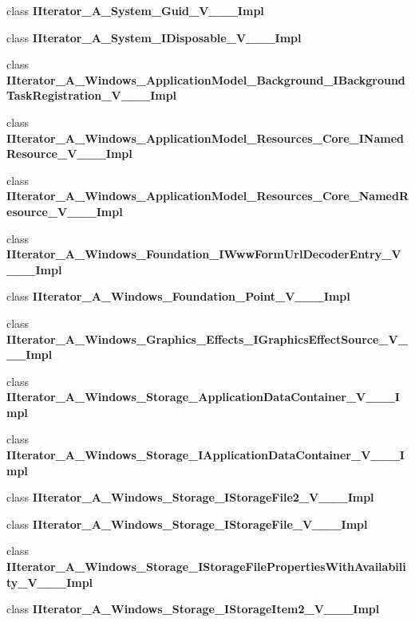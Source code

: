 \begin{DoxyCompactItemize}
\item 
class {\bfseries I\+Iterator\+\_\+\+A\+\_\+\+System\+\_\+\+Guid\+\_\+\+V\+\_\+\+\_\+\+\_\+\+Impl}
\item 
class {\bfseries I\+Iterator\+\_\+\+A\+\_\+\+System\+\_\+\+I\+Disposable\+\_\+\+V\+\_\+\+\_\+\+\_\+\+Impl}
\item 
class {\bfseries I\+Iterator\+\_\+\+A\+\_\+\+Windows\+\_\+\+Application\+Model\+\_\+\+Background\+\_\+\+I\+Background\+Task\+Registration\+\_\+\+V\+\_\+\+\_\+\+\_\+\+Impl}
\item 
class {\bfseries I\+Iterator\+\_\+\+A\+\_\+\+Windows\+\_\+\+Application\+Model\+\_\+\+Resources\+\_\+\+Core\+\_\+\+I\+Named\+Resource\+\_\+\+V\+\_\+\+\_\+\+\_\+\+Impl}
\item 
class {\bfseries I\+Iterator\+\_\+\+A\+\_\+\+Windows\+\_\+\+Application\+Model\+\_\+\+Resources\+\_\+\+Core\+\_\+\+Named\+Resource\+\_\+\+V\+\_\+\+\_\+\+\_\+\+Impl}
\item 
class {\bfseries I\+Iterator\+\_\+\+A\+\_\+\+Windows\+\_\+\+Foundation\+\_\+\+I\+Www\+Form\+Url\+Decoder\+Entry\+\_\+\+V\+\_\+\+\_\+\+\_\+\+Impl}
\item 
class {\bfseries I\+Iterator\+\_\+\+A\+\_\+\+Windows\+\_\+\+Foundation\+\_\+\+Point\+\_\+\+V\+\_\+\+\_\+\+\_\+\+Impl}
\item 
class {\bfseries I\+Iterator\+\_\+\+A\+\_\+\+Windows\+\_\+\+Graphics\+\_\+\+Effects\+\_\+\+I\+Graphics\+Effect\+Source\+\_\+\+V\+\_\+\+\_\+\+\_\+\+Impl}
\item 
class {\bfseries I\+Iterator\+\_\+\+A\+\_\+\+Windows\+\_\+\+Storage\+\_\+\+Application\+Data\+Container\+\_\+\+V\+\_\+\+\_\+\+\_\+\+Impl}
\item 
class {\bfseries I\+Iterator\+\_\+\+A\+\_\+\+Windows\+\_\+\+Storage\+\_\+\+I\+Application\+Data\+Container\+\_\+\+V\+\_\+\+\_\+\+\_\+\+Impl}
\item 
class {\bfseries I\+Iterator\+\_\+\+A\+\_\+\+Windows\+\_\+\+Storage\+\_\+\+I\+Storage\+File2\+\_\+\+V\+\_\+\+\_\+\+\_\+\+Impl}
\item 
class {\bfseries I\+Iterator\+\_\+\+A\+\_\+\+Windows\+\_\+\+Storage\+\_\+\+I\+Storage\+File\+\_\+\+V\+\_\+\+\_\+\+\_\+\+Impl}
\item 
class {\bfseries I\+Iterator\+\_\+\+A\+\_\+\+Windows\+\_\+\+Storage\+\_\+\+I\+Storage\+File\+Properties\+With\+Availability\+\_\+\+V\+\_\+\+\_\+\+\_\+\+Impl}
\item 
class {\bfseries I\+Iterator\+\_\+\+A\+\_\+\+Windows\+\_\+\+Storage\+\_\+\+I\+Storage\+Item2\+\_\+\+V\+\_\+\+\_\+\+\_\+\+Impl}

\end{DoxyCompactItemize}
